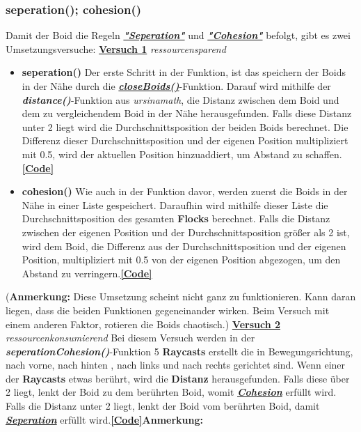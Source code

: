 \documentclass[a4paper, hidelinks, 12pt]{article}
\begin{document}
\subsubsection{seperation(); cohesion()}\label{seperationCohesion}
Damit der Boid die Regeln \hyperref[IdeeSeperation]{\textbf{\emph{"Seperation"}}} und \hyperref[IdeeCohesion]{\textbf{\emph{"Cohesion"}}} befolgt, gibt es zwei Umsetzungsversuche:\newline\newline
\underline{\textbf{Versuch 1}} \emph{ressourcensparend}
\begin{itemize}
	\item \textbf{seperation()}\label{Umsetzungseperation}\newline
	Der erste Schritt in der Funktion, ist das speichern der Boids in der Nähe durch die \hyperref[UmsetzungcloseBoids]{\textbf{\emph{closeBoids()}}}-Funktion. Darauf wird mithilfe der \textbf{\emph{distance()}}-Funktion aus \emph{ursinamath}, die Distanz\cite{distance} zwischen dem Boid und dem zu vergleichendem Boid in der Nähe herausgefunden. Falls diese Distanz unter 2 liegt wird die Durchschnittsposition der beiden Boids berechnet. Die Differenz dieser Durchschnittsposition und der eigenen Position multipliziert mit 0.5, wird der aktuellen Position hinzuaddiert, um Abstand zu schaffen.\hyperref[Codeseperation]{\textbf{[Code]}}
	\item \textbf{cohesion()}\label{Umsetzungcohesion}\newline
	Wie auch in der Funktion davor, werden zuerst die Boids in der Nähe in einer Liste gespeichert. Daraufhin wird mithilfe dieser Liste die Durchschnittsposition des gesamten \textbf{Flocks} berechnet. Falls die Distanz\cite{distance} zwischen der eigenen Position und der Durchschnittsposition größer als 2 ist, wird dem Boid, die Differenz aus der Durchschnittsposition und der eigenen Position, multipliziert mit 0.5 von der eigenen Position abgezogen, um den Abstand zu verringern.\hyperref[Codecohesion]{\textbf{[Code]}}
\end{itemize}
\scriptsize(\textbf{Anmerkung:} Diese Umsetzung scheint nicht ganz zu funktionieren. Kann daran liegen, dass die beiden Funktionen gegeneinander wirken. Beim Versuch mit einem anderen Faktor, rotieren die Boids chaotisch.)
\normalsize\newline\newline
\underline{\textbf{Versuch 2}} \emph{ressourcenkonsumierend}\label{UmsetzungseperationCohesion}\newline
Bei diesem Versuch werden in der \textbf{\emph{seperationCohesion()}}-Funktion 5 \textbf{Raycasts} erstellt die in Bewegungsrichtung, nach vorne, nach hinten , nach links und nach rechts gerichtet sind. Wenn einer der \textbf{Raycasts}\cite{raycast} etwas berührt, wird die \textbf{Distanz}\cite{HitInfo} herausgefunden. Falls diese über 2 liegt, lenkt der Boid zu dem berührten Boid, womit \hyperref[IdeeCohesion]{\textbf{\emph{Cohesion}}} erfüllt wird. Falls die Distanz unter 2 liegt, lenkt der Boid vom berührten Boid, damit \hyperref[IdeeSeperation]{\textbf{\emph{Seperation}}} erfüllt wird.\hyperref[CodeseperationCohesion]{\textbf{[Code]}}\newline\newline\scriptsize\textbf{Anmerkung:}
\end{document}
